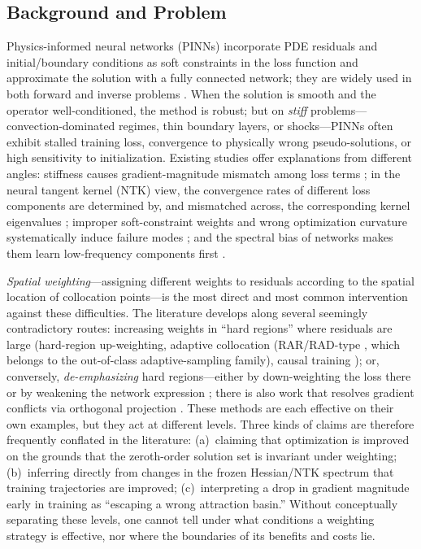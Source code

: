 \documentclass[11pt]{article}
\numberwithin{equation}{section}
\begin{document}
\subsection{Background and Problem}\label{sec:bg}
Physics-informed neural networks (PINNs) incorporate PDE residuals and initial/boundary conditions as soft constraints in the loss function and approximate the solution with a fully connected network; they are widely used in both forward and inverse problems \cite{Raissi2019,Karniadakis2021,Cuomo2022}. When the solution is smooth and the operator well-conditioned, the method is robust; but on \emph{stiff} problems---convection-dominated regimes, thin boundary layers, or shocks---PINNs often exhibit stalled training loss, convergence to physically wrong pseudo-solutions, or high sensitivity to initialization. Existing studies offer explanations from different angles: stiffness causes gradient-magnitude mismatch among loss terms \cite{WangTeng2020}; in the neural tangent kernel (NTK) view, the convergence rates of different loss components are determined by, and mismatched across, the corresponding kernel eigenvalues \cite{Jacot2018,Wang2020NTK}; improper soft-constraint weights and wrong optimization curvature systematically induce failure modes \cite{Krishnapriyan2021}; and the spectral bias of networks makes them learn low-frequency components first \cite{Rahaman2019,Tancik2020}.

\emph{Spatial weighting}---assigning different weights to residuals according to the spatial location of collocation points---is the most direct and most common intervention against these difficulties. The literature develops along several seemingly contradictory routes: increasing weights in ``hard regions'' where residuals are large (hard-region up-weighting, adaptive collocation (RAR/RAD-type \cite{Wu2022,Nabian2021}, which belongs to the out-of-class adaptive-sampling family), causal training \cite{Wang2022causal}); or, conversely, \emph{de-emphasizing} hard regions---either by down-weighting the loss there or by weakening the network expression \cite{Liu2022down,LessEmphasis2022}; there is also work that resolves gradient conflicts via orthogonal projection \cite{ConFIG2025}. These methods are each effective on their own examples, but they act at different levels. Three kinds of claims are therefore frequently conflated in the literature: (a)~claiming that optimization is improved on the grounds that the zeroth-order solution set is invariant under weighting; (b)~inferring directly from changes in the frozen Hessian/NTK spectrum that training trajectories are improved; (c)~interpreting a drop in gradient magnitude early in training as ``escaping a wrong attraction basin.'' Without conceptually separating these levels, one cannot tell under what conditions a weighting strategy is effective, nor where the boundaries of its benefits and costs lie.
\end{document}

